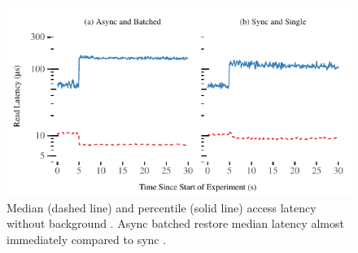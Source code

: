\begin{figure}[t]
\centering
\includegraphics[width=1.0\columnwidth]{graphs/running-latency-only-priority}
  \caption{Median (dashed line) and \nnnth percentile (solid line)
  access latency without background \pulls. Async batched
  \priopulls restore median latency almost immediately compared
  to sync \priopulls.}
\label{fig:batching-lat}
\end{figure}
